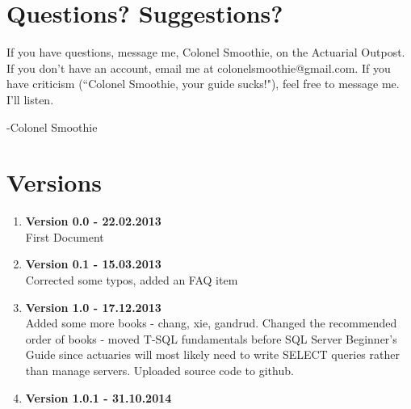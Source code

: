 \documentclass[oneside, titlepage]{article}
\begin{document}
\begin{enumerate}
\end{enumerate}

\section{Questions? Suggestions?}
If you have questions, message me, Colonel Smoothie, on the Actuarial Outpost. If you don't have an account, email me at colonelsmoothie@gmail.com. If you have criticism (``Colonel Smoothie, your guide sucks!"), feel free to message me. I'll listen.

-Colonel Smoothie

\section{Versions}
\begin{enumerate}
\item{\bfseries Version 0.0 - 22.02.2013}\\
First Document
\item{\bfseries Version 0.1 - 15.03.2013}\\
Corrected some typos, added an FAQ item
\item{\bfseries Version 1.0 - 17.12.2013}\\
Added some more books - chang, xie, gandrud. Changed the recommended order of books - moved T-SQL fundamentals before SQL Server Beginner's Guide since actuaries will most likely need to write SELECT queries rather than manage servers. Uploaded source code to github.
\item{\bfseries Version 1.0.1 - 31.10.2014}\\

\end{enumerate}
\end{document}

